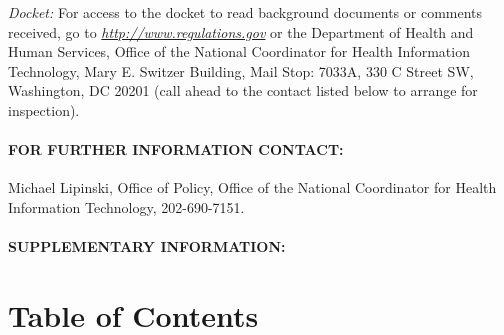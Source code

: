 \documentclass[twoside,11pt]{article}
\begin{document}
            
              \emph{Docket:} For access to the docket to read background documents or comments received, go to \emph{\url{http://www.regulations.gov}} or the Department of Health and Human Services, Office of the National Coordinator for Health Information Technology, Mary E. Switzer Building, Mail Stop: 7033A, 330 C Street SW, Washington, DC 20201 (call ahead to the contact listed below to arrange for inspection).


          
          
            \paragraph{FOR FURTHER INFORMATION CONTACT:}

            Michael Lipinski, Office of Policy, Office of the National Coordinator for Health Information Technology, 202-690-7151.


          
        
        
          \paragraph{SUPPLEMENTARY INFORMATION:}

          \section{Table of Contents}

          


















\end{document}
